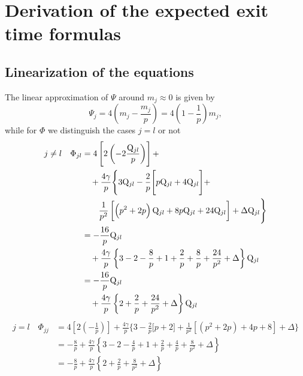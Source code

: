 \section{Derivation of the expected exit time formulas}

\label{2305:app:exit_time-derivation}

\subsection{Linearization of the equations}
The linear approximation of \(\Psi\) around $m_{j}\approx 0$ is given by
\begin{equation}
  \Psi_{j} = 4
      \left(m_{j} - \frac{m_{j}}{p}\right) 
      = 4 \left(1 - \frac{1}{p}\right) m_{j},
\end{equation}
while for \(\Phi\) we distinguish the cases \(j=l\) or not
\begin{equation}\begin{split}
  j \neq l \quad \Phi_{jl} &= 4\left[
      2\left( - 2\frac{\mathrm{Q}_{jl}}{p}\right)
  \right] +\\
  &\quad+\frac{4 \gamma}{p} \Biggr\{
        3 \mathrm{Q}_{jl} -\frac2{p}\Biggl[p \mathrm{Q}_{jl} + 4 \mathrm{Q}_{jl} \Biggl] + \\
  &\qquad\frac1{p^2}\left[\left(p^2+2p\right)\mathrm{Q}_{jl} +
        8p \mathrm{Q}_{jl} + 24\mathrm{Q}_{jl} \right] + \Delta \mathrm{Q}_{jl}\Biggr\} \\
  &= -\frac{16}{p} \mathrm{Q}_{jl} \\
    &\quad+\frac{4 \gamma}{p} \left\{
      3 -2 -\frac{8}{p} +1 +\frac2p +\frac8p + \frac{24}{p^2} + \Delta \right\}\mathrm{Q}_{jl} \\
  &= -\frac{16}{p} \mathrm{Q}_{jl} \\
  &\quad+\frac{4 \gamma}{p} \left\{2 +\frac{2}{p} + \frac{24}{p^2} + \Delta \right\}\mathrm{Q}_{jl}
\end{split}\end{equation}
\begin{equation}\begin{split}
  j = l \quad \Phi_{jj} &= 4\left[
      2\left( -\frac{1}{p}\right)
  \right] + \frac{4 \gamma}{p} \Biggr\{
        3 -\frac2{p}\Biggl[p + 2 \Biggl] + 
        \frac1{p^2}\left[\left(p^2+2p\right) +
        4p + 8 \right] + \Delta\Biggr\} \\
  &= -\frac{8}{p} + \frac{4 \gamma}{p} \left\{
    3 -2 -\frac{4}{p} +1 +\frac2p +\frac4p + \frac{8}{p^2} + \Delta \right\} \\
  &= -\frac{8}{p} +\frac{4 \gamma}{p} \left\{2 +\frac{2}{p} + \frac{8}{p^2} + \Delta \right\}
\end{split}\end{equation}

